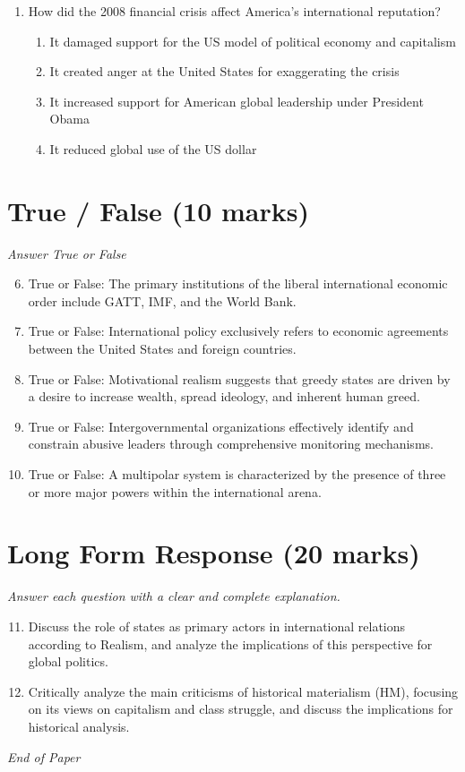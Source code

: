 \documentclass[12pt]{article}
\begin{document}
\begin{enumerate}[label=\arabic*.]
\begin{enumerate}[label=(\alph*)]
    \item Smart bomb.
    \item Precision target.
\end{enumerate}
\item How did the 2008 financial crisis affect America's international reputation?
\begin{enumerate}[label=(\alph*)]
    \item It damaged support for the US model of political economy and capitalism
    \item It created anger at the United States for exaggerating the crisis
    \item It increased support for American global leadership under President Obama
    \item It reduced global use of the US dollar
\end{enumerate}
\end{enumerate}

\section*{True / False (10 marks)}
\textit{Answer True or False}
\begin{enumerate}[label=\arabic*.]
\setcounter{enumi}{5}
\item True or False: The primary institutions of the liberal international economic order include GATT, IMF, and the World Bank.
\item True or False: International policy exclusively refers to economic agreements between the United States and foreign countries.
\item True or False: Motivational realism suggests that greedy states are driven by a desire to increase wealth, spread ideology, and inherent human greed.
\item True or False: Intergovernmental organizations effectively identify and constrain abusive leaders through comprehensive monitoring mechanisms.
\item True or False: A multipolar system is characterized by the presence of three or more major powers within the international arena.
\end{enumerate}

\section*{Long Form Response (20 marks)}
\textit{Answer each question with a clear and complete explanation.}
\begin{enumerate}[label=\arabic*.]
\setcounter{enumi}{10}
\item Discuss the role of states as primary actors in international relations according to Realism, and analyze the implications of this perspective for global politics.
\item Critically analyze the main criticisms of historical materialism (HM), focusing on its views on capitalism and class struggle, and discuss the implications for historical analysis.
\end{enumerate}

\vfill
\noindent\textit{End of Paper}
\end{document}
